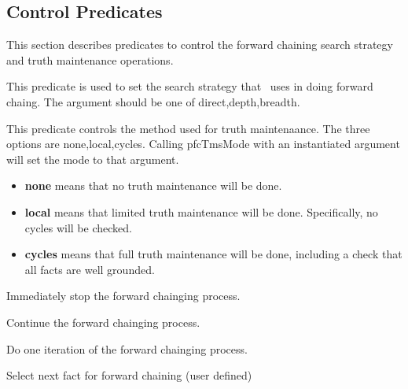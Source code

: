 \subsection{Control Predicates}

This section describes predicates to control the forward chaining
search strategy and truth maintenance operations.


This predicate is used to set the search strategy that \pfc\ uses in
doing forward chaing.  The argument should be one of
{direct,depth,breadth}.


This predicate controls the method used for truth maintenaance.  The
three options are {none,local,cycles}. Calling pfcTmsMode with an
instantiated argument will set the mode to that argument. 
\begin{itemize}

\item {\bf none} means that no truth maintenance will be done.

\item {\bf local} means that limited truth maintenance will be done. Specifically, no cycles will be checked.

\item {\bf cycles} means that full truth maintenance will be done,
including a check that all facts are well grounded.

\end{itemize}



Immediately stop the forward chainging process.


Continue the forward chainging process.


Do one iteration of the forward chainging process.


Select next fact for forward chaining (user defined)





